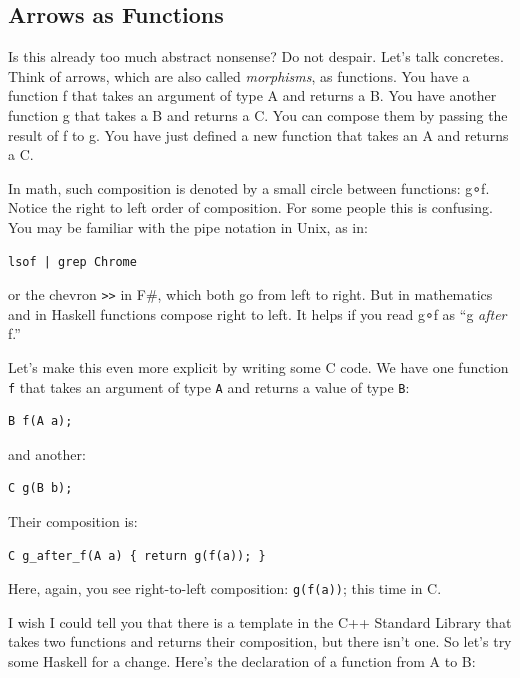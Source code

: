 \subsection{Arrows as Functions}\label{arrows-as-functions}

Is this already too much abstract nonsense? Do not despair. Let's talk
concretes. Think of arrows, which are also called \emph{morphisms}, as
functions. You have a function f that takes an argument of type A and
returns a B. You have another function g that takes a B and returns a C.
You can compose them by passing the result of f to g. You have just
defined a new function that takes an A and returns a C.

In math, such composition is denoted by a small circle between
functions: g∘f. Notice the right to left order of composition. For some
people this is confusing. You may be familiar with the pipe notation in
Unix, as in:

\begin{verbatim}
lsof | grep Chrome
\end{verbatim}

or the chevron \texttt{\textgreater{}\textgreater{}} in F\#, which both
go from left to right. But in mathematics and in Haskell functions
compose right to left. It helps if you read g∘f as ``g \emph{after} f.''

Let's make this even more explicit by writing some C code. We have one
function \texttt{f} that takes an argument of type \texttt{A} and
returns a value of type \texttt{B}:

\begin{verbatim}
B f(A a);
\end{verbatim}

and another:

\begin{verbatim}
C g(B b);
\end{verbatim}

Their composition is:

\begin{verbatim}
C g_after_f(A a) { return g(f(a)); }
\end{verbatim}

Here, again, you see right-to-left composition: \texttt{g(f(a))}; this
time in C.

I wish I could tell you that there is a template in the C++ Standard
Library that takes two functions and returns their composition, but
there isn't one. So let's try some Haskell for a change. Here's the
declaration of a function from A to B:

